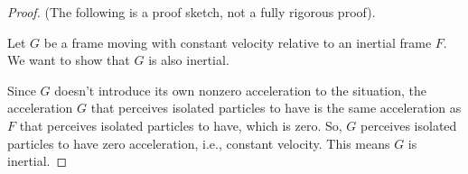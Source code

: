 \documentclass{article}
\begin{document}
\begin{proof}
    (The following is a proof sketch, not a fully rigorous proof). 
    
    Let $G$ be a frame moving with constant velocity relative to an inertial frame $F$. We want to show that $G$ is also inertial. 
    
    Since $G$ doesn't introduce its own nonzero acceleration to the situation, the acceleration $G$ that perceives isolated particles to have is the same acceleration as $F$ that perceives isolated particles to have, which is zero. So, $G$ perceives isolated particles to have zero acceleration, i.e., constant velocity. This means $G$ is inertial.
    




\end{proof}
\end{document}
